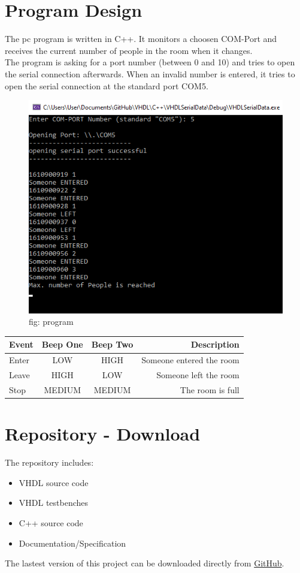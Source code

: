 \documentclass[12pt,a4 paper] {report}
\begin{document}
\chapter{Program Design}
The pc program is written in C++. It monitors a choosen COM-Port and receives the current number of people in the room when it changes.\\
The program is asking for a port number (between 0 and 10) and tries to open the serial connection afterwards. When an invalid number is entered, it tries to open the serial connection at the standard port COM5.
\begin{figure}[h]
	\centering	
	\includegraphics[scale=0.8]{../png/program.png}
	\newline
	fig: program\\
\end{figure}
\begin{center}
	\begin{tabular}{|l|c|c|r|}
		\hline
		\textbf{Event} & \textbf{Beep One} & \textbf{Beep Two} & \textbf{Description} \\
		\hline
		Enter & LOW & HIGH & Someone entered the room \\
		\hline
		Leave & HIGH & LOW & Someone left the room \\
		\hline
		Stop & MEDIUM & MEDIUM & The room is full \\
		\hline
	\end{tabular}
\end{center}

\newpage

\chapter{Repository - Download}
The repository includes:
\begin{itemize}
	\item VHDL source code
	\item VHDL testbenches
	\item C++ source code
	\item Documentation/Specification
\end{itemize}
The lastest version of this project can be downloaded directly from \href{https://github.com/nlsy/VHDL}{GitHub}. \\
\end{document}
